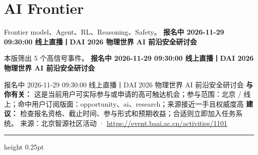 \documentclass[10.5pt]{ctexart}
\begin{document}
\section*{AI Frontier}
{\color{ormuted} Frontier model、Agent、RL、Reasoning、Safety。}
\vspace{2mm}
{\LARGE\bfseries 报名中 2026-11-29 09:30:00 线上直播丨DAI 2026 物理世界 AI 前沿安全研讨会}\par
\vspace{1mm}
{\color{ormuted} 本版筛出 5 个高信号事件。}
\vspace{3mm}
{\Large\bfseries 报名中 2026-11-29 09:30:00 线上直播丨DAI 2026 物理世界 AI 前沿安全研讨会}\par
报名中 2026-11-29 09:30:00 线上直播丨DAI 2026 物理世界 AI 前沿安全研讨会
\textbf{与你有关：} 这是当前用户可实际参与或申请的高可触达机会；参与范围：北京 / 线上；命中用户订阅版面：opportunity、ai、research；来源接近一手且权威度高
\textbf{建议：} 检查报名资格、截止时间、参与形式和预期收益；合适则立即加入任务系统。
{\footnotesize\color{ormuted} 来源：北京智源社区活动 · \url{https://event.baai.ac.cn/activities/1101}}
\vspace{4mm}
\hrule height 0.25pt
\vspace{3mm}
\end{document}
